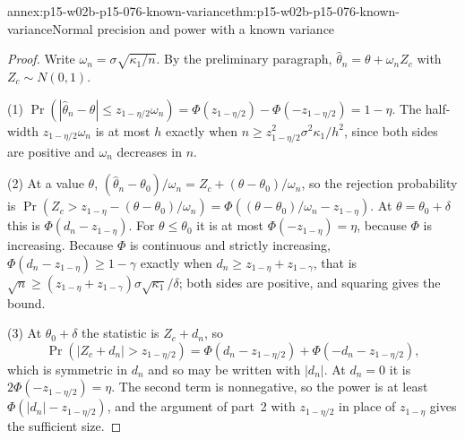 \begin{annexitem}{annex:p15-w02b-p15-076-known-variance}{thm:p15-w02b-p15-076-known-variance}{Normal precision and power with a known variance}
\begin{proof}
Write \(\omega_n=\sigma\sqrt{\kappa_1/n}\). By the preliminary paragraph,
\(\widehat\theta_n=\theta+\omega_nZ_c\) with \(Z_c\sim N(0,1)\).

(1) \(\Pr(|\widehat\theta_n-\theta|\leq z_{1-\eta/2}\omega_n)
=\Phi(z_{1-\eta/2})-\Phi(-z_{1-\eta/2})=1-\eta\). The half-width
\(z_{1-\eta/2}\omega_n\) is at most \(h\) exactly when
\(n\geq z_{1-\eta/2}^2\sigma^2\kappa_1/h^2\), since both sides are
positive and \(\omega_n\) decreases in \(n\).

(2) At a value \(\theta\),
\((\widehat\theta_n-\theta_0)/\omega_n=Z_c+(\theta-\theta_0)/\omega_n\), so
the rejection probability is
\(\Pr(Z_c>z_{1-\eta}-(\theta-\theta_0)/\omega_n)
=\Phi((\theta-\theta_0)/\omega_n-z_{1-\eta})\). At
\(\theta=\theta_0+\delta\) this is \(\Phi(d_n-z_{1-\eta})\). For
\(\theta\leq\theta_0\) it is at most \(\Phi(-z_{1-\eta})=\eta\), because
\(\Phi\) is increasing. Because \(\Phi\) is continuous and strictly
increasing, \(\Phi(d_n-z_{1-\eta})\geq1-\gamma\) exactly when
\(d_n\geq z_{1-\eta}+z_{1-\gamma}\), that is
\(\sqrt n\geq(z_{1-\eta}+z_{1-\gamma})\sigma\sqrt{\kappa_1}/\delta\);
both sides are positive, and squaring gives the bound.

(3) At \(\theta_0+\delta\) the statistic is \(Z_c+d_n\), so
\[
 \Pr(|Z_c+d_n|>z_{1-\eta/2})
 =\Phi(d_n-z_{1-\eta/2})+\Phi(-d_n-z_{1-\eta/2}),
\]
which is symmetric in \(d_n\) and so may be written with \(|d_n|\). At
\(d_n=0\) it is \(2\Phi(-z_{1-\eta/2})=\eta\). The second term is
nonnegative, so the power is at least \(\Phi(|d_n|-z_{1-\eta/2})\), and
the argument of part~2 with \(z_{1-\eta/2}\) in place of \(z_{1-\eta}\)
gives the sufficient size.
\end{proof}
\end{annexitem}

